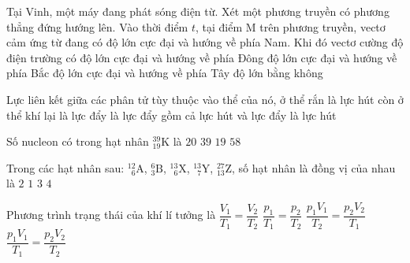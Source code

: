 	\begin{ex}%
		Tại Vinh, một máy đang phát sóng điện từ. Xét một phương truyền có phương thẳng đứng hướng lên. Vào thời điểm $t$, tại điểm M trên phương truyền, vectơ cảm ứng từ đang có độ lớn cực đại và hướng về phía Nam. Khi đó vectơ cường độ điện trường có
		\choice
		{độ lớn cực đại và hướng về phía Đông}
		{độ lớn cực đại và hướng về phía Bắc}
		{\True độ lớn cực đại và hướng về phía Tây}
		{độ lớn bằng không}
	\end{ex}

	\begin{ex}%
		Lực liên kết giữa các phân tử
		\choice
		{tùy thuộc vào thể của nó, ở thể rắn là lực hút còn ở thể khí lại là lực đẩy}
		{là lực đẩy}
		{\True gồm cả lực hút và lực đẩy}
		{là lực hút}
	\end{ex}

	\begin{ex}%
		Số nucleon có trong hạt nhân ${}^{39}_{19}\text{K}$ là
		\choice
		{$20$}
		{\True $39$}
		{$19$}
		{$58$}
	\end{ex}

	\begin{ex}%
		Trong các hạt nhân sau: ${}^{12}_{\phantom{1}6}\text{A}$, ${}^{6}_{3}\text{B}$, ${}^{13}_{\phantom{1}6}\text{X}$, ${}^{13}_{\phantom{1}7}\text{Y}$, ${}^{27}_{13}\text{Z}$, số hạt nhân là đồng vị của nhau là
		\choice
		{\True $2$}
		{$1$}
		{$3$}
		{$4$}
	\end{ex}

	\begin{ex}%
		Phương trình trạng thái của khí lí tưởng là
		\choice
		{$\dfrac{V_1}{T_1}=\dfrac{V_2}{T_2}$}
		{$\dfrac{p_1}{T_1}=\dfrac{p_2}{T_2}$}
		{$\dfrac{p_1V_1}{T_2}=\dfrac{p_2V_2}{T_1}$}
		{\True $\dfrac{p_1V_1}{T_1}=\dfrac{p_2V_2}{T_2}$}
	\end{ex}

